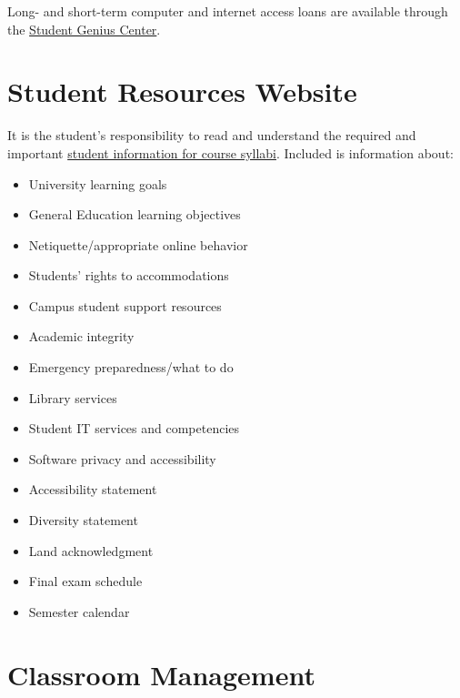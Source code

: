 \documentclass[11pt]{article}     %
\begin{document}
\noindent Long- and short-term computer and internet access loans are available through the \href{http://www.fullerton.edu/it/students/sgc/index.php}{Student Genius Center}.

\section*{Student Resources Website}
It is the student's responsibility to read and understand the required and important \href{https://fdc.fullerton.edu/teaching/student-info-syllabi.html}{student information for course syllabi}. Included is information about:

\begin{itemize}
\item University learning goals
\item General Education learning objectives
\item Netiquette/appropriate online behavior
\item Students' rights to accommodations
\item Campus student support resources
\item Academic integrity
\item Emergency preparedness/what to do
\item Library services
\item Student IT services and competencies
\item Software privacy and accessibility
\item Accessibility statement
\item Diversity statement
\item Land acknowledgment
\item Final exam schedule
\item Semester calendar
\end{itemize}

\section*{Classroom Management}
\end{document}
